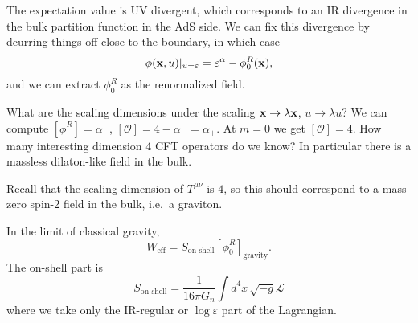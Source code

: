 The expectation value is UV divergent, which corresponds to an IR divergence in the bulk partition function in the AdS side.
We can fix this divergence by dcurring things off close to the boundary, in which case
\[
\phi(\mathbf{x}, u)|_{u = \varepsilon} = \varepsilon^\alpha - \phi_0^R(\mathbf{x}),
\]
and we can extract $\phi_0^R$ as the renormalized field.

What are the scaling dimensions under the scaling $\mathbf{x} \to \lambda \mathbf{x}$, $u \to \lambda u$?
We can compute $[\phi^R] = \alpha_-$, $[\mathcal O] = 4 - \alpha_- = \alpha_+$.
At $m = 0$ we get $[\mathcal O] = 4$.
How many interesting dimension 4 CFT operators do we know?
In particular there is a massless dilaton-like field in the bulk.

Recall that the scaling dimension of $T^{\mu \nu}$ is $4$, so this should correspond to a mass-zero spin-2 field in the bulk, i.e.~a graviton.

In the limit of classical gravity,
\[
W_{\text{eff}} = S_{\text{on-shell}}[\phi_0^R]_{\text{gravity}}.
\]
The on-shell part is
\[
S_{\text{on-shell}} = \frac{1}{16 \pi G_n} \int d^4x\, \sqrt{-g} \mathcal L
\]
where we take only the IR-regular or $\log \varepsilon$ part of the Lagrangian.

